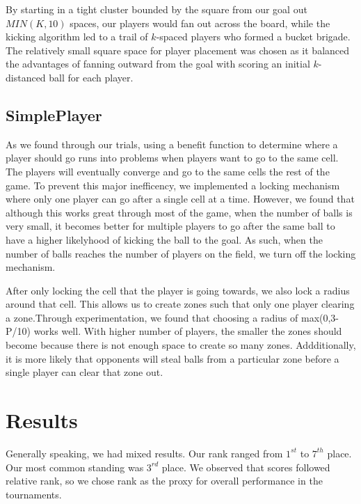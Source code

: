 \documentclass[
10pt, %
letterpaper, %
oneside, %
headinclude,footinclude, %
english
]{article}
\begin{document}
By starting in a tight cluster bounded by the square from our goal out $MIN(K,10)$ spaces, our players would fan out across the board, while the kicking algorithm led to a trail of $k$-spaced players who formed a bucket brigade. The relatively small square space for player placement was chosen as it balanced the advantages of fanning outward from the goal with scoring an initial $k$-distanced ball for each player.

\subsection{SimplePlayer}
As we found through our trials, using a benefit function to determine where a player should go runs into problems when players want to go to the same cell. The players will eventually converge and go to the same cells the rest of the game. To prevent this major inefficency, we implemented a locking mechanism where only one player can go after a single cell at a time. However, we found that although this works great through most of the game, when the number of balls is very small, it becomes better for multiple players to go after the same ball to have a higher likelyhood of kicking the ball to the goal. As such, when the number of balls reaches the number of players on the field, we turn off the locking mechanism.

After only locking the cell that the player is going towards, we also lock a radius around that cell. This allows us to create zones such that only one player clearing a zone.Through experimentation, we found that choosing a radius of max(0,3-P/10) works well. With higher number of players, the smaller the zones should become because there is not enough space to create so many zones. Addditionally, it is more likely that opponents will steal balls from a particular zone before a single player can clear that zone out.

\section{Results}
Generally speaking, we had mixed results. Our rank ranged from $1^{st}$ to $7^{th}$ place. Our most common standing was $3^{rd}$ place. We observed that scores followed relative rank, so we chose rank as the proxy for overall performance in the tournaments.
\end{document}
